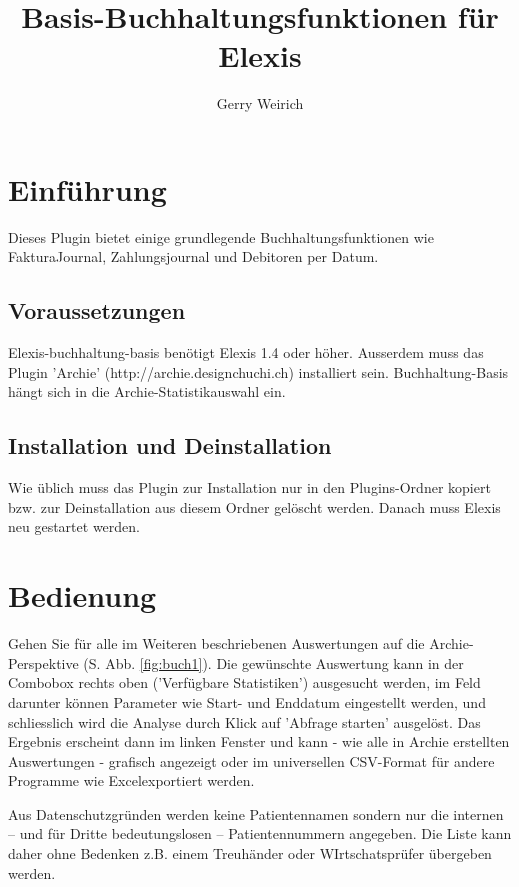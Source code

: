 \documentclass[a4paper]{scrartcl}
\begin{document}
\title{Basis-Buchhaltungsfunktionen für Elexis}
\author{Gerry Weirich}
\maketitle

\section{Einführung}
Dieses Plugin bietet einige grundlegende Buchhaltungsfunktionen wie FakturaJournal, Zahlungsjournal und Debitoren per Datum.

\subsection{Voraussetzungen}
Elexis-buchhaltung-basis benötigt Elexis 1.4 oder höher. Ausserdem muss das Plugin 'Archie' (http://archie.designchuchi.ch) installiert sein. Buchhaltung-Basis hängt sich in die Archie-Statistikauswahl ein.

\subsection{Installation und Deinstallation}
Wie üblich muss das Plugin zur Installation nur in den Plugins-Ordner kopiert bzw. zur Deinstallation aus diesem Ordner gelöscht werden. Danach muss Elexis neu gestartet werden.

\section{Bedienung}
Gehen Sie für alle im Weiteren beschriebenen Auswertungen auf die Archie-Perspektive (S. Abb. \ref{fig:buch1}). Die gewünschte Auswertung kann in der Combobox rechts oben ('Verfügbare Statistiken') ausgesucht werden, im Feld darunter können Parameter wie Start- und Enddatum eingestellt werden, und schliesslich wird die Analyse durch Klick auf 'Abfrage starten' ausgelöst. Das Ergebnis erscheint dann im linken Fenster und kann - wie alle in Archie erstellten Auswertungen - grafisch angezeigt oder im universellen CSV-Format für andere Programme wie Excel\texttrademark exportiert werden.

\medskip

Aus Datenschutzgründen werden keine Patientennamen sondern nur die internen -- und für Dritte bedeutungslosen -- Patientennummern angegeben. Die Liste kann daher ohne Bedenken z.B. einem Treuhänder oder WIrtschatsprüfer übergeben werden.
\end{document}
